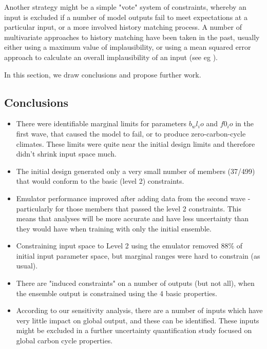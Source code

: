 \documentclass[gmd, manuscript]{copernicus}
\begin{document}
Another strategy might be a simple "vote" system of constraints, whereby an input is excluded if a number of model outputs fail to meet expectations at a particular input, or a more involved history matching process. A number of multivariate approaches to history matching have been taken in the past, usually either using a maximum value of implausibility, or using a mean squared error approach to calculate an overall implausibility of an input (see eg \cite{vernon2010galaxy}).

\label{sec:conclusions}  %
In this section, we draw conclusions and propose further work.

\subsection{Conclusions}\label{ssec:conclusions}

\begin{itemize}
    \item There were identifiable marginal limits for parameters $b_wl_io$ and $f0_io$ in the first wave, that caused the model to fail, or to produce zero-carbon-cycle climates. These limits were quite near the initial design limits and therefore didn't shrink input space much.
    
    \item The initial design generated only a very small number of members (37/499) that would conform to the basic (level 2) constraints.
    
    \item Emulator performance improved after adding data from the  second wave - particularly for those members that passed the level 2 constraints. This means that analyses will be more accurate and have less uncertainty than they would have when training with only the initial ensemble.
    
    \item Constraining input space to Level 2 using the emulator removed 88\% of initial input parameter space, but marginal ranges were hard to constrain (as usual).
    
    \item There are "induced constraints" on a number of outputs (but not all), when the ensemble output is constrained using the 4 basic properties.
    
    \item According to our sensitivity analysis, there are a number of inputs which have very little impact on global output, and these can be identified. These inputs might be excluded in a further uncertainty quantification study focused on global carbon cycle properties.
    
\end{itemize}
\end{document}
